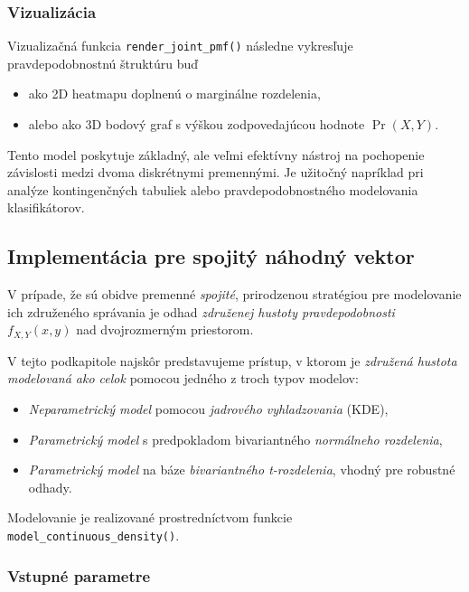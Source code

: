 \subsubsection{Vizualizácia}
Vizualizačná funkcia \texttt{render\_joint\_pmf()} následne vykresľuje pravdepodobnostnú štruktúru buď

\begin{itemize}
\setlength{\itemsep}{0pt}
  \setlength{\parskip}{0pt}
  \item ako 2D heatmapu doplnenú o marginálne rozdelenia,
  \item alebo ako 3D bodový graf s výškou zodpovedajúcou hodnote $\Pr(X,Y)$.
\end{itemize}

Tento model poskytuje základný, ale veľmi efektívny nástroj na pochopenie závislosti medzi dvoma diskrétnymi premennými. Je užitočný napríklad pri analýze kontingenčných tabuliek alebo pravdepodobnostného modelovania klasifikátorov.

\subsection{Implementácia pre spojitý náhodný vektor}

V prípade, že sú obidve premenné \textit{spojité}, prirodzenou stratégiou pre modelovanie ich združeného správania je odhad \textit{združenej hustoty pravdepodobnosti} $f_{X,Y}(x, y)$ nad dvojrozmerným priestorom.

V tejto podkapitole najskôr predstavujeme prístup, v ktorom je \textit{združená hustota modelovaná ako celok} pomocou jedného z troch typov modelov:

\begin{itemize}
\setlength{\itemsep}{0pt}
  \setlength{\parskip}{0pt}
  \item \textit{Neparametrický model} pomocou \textit{jadrového vyhladzovania} (KDE),
  \item \textit{Parametrický model} s predpokladom bivariantného \textit{normálneho rozdelenia},
  \item \textit{Parametrický model} na báze \textit{bivariantného t-rozdelenia}, vhodný pre robustné odhady.
\end{itemize}

Modelovanie je realizované prostredníctvom funkcie \texttt{model\_continuous\_density()}.

\subsubsection{Vstupné parametre}

